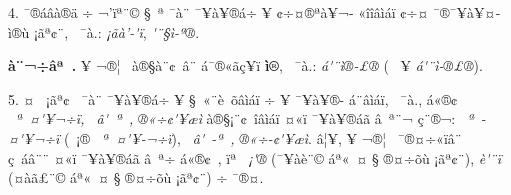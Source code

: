 \documentclass[12pt,twoside,a4paper]{article}
\newenvironment{prym}
               {\list{}{\leftmargin1.7\parindent
                        \listparindent\parindent
                        \itemindent\parindent
                        \parsep0.5ex\topsep1ex   
               }%
                        \footnotesize
                        \item\relax}
               {\endlist}
\begin{document}
4. ^^80^^af^^ae^^e1^^e2^^e0^^ae^^e4 ^^f7 ^^ac'^^ef^^aa^^a8^^a9 ^^a7^^ad^^a0^^aa ^^af^^e0^^a8 ^^af^^a5^^e0^^a5^^ad^^ae^^e1^^f7 ^^ad^^a5 ^^a2^^f7^^a4^^ae^^aa^^e0^^a5^^ac-\linebreak
^^ab^^ee^^ee^^e2^^ec^^e1^^ef ^^a2^^f7^^a4 ^^af^^ae^^af^^a5^^e0^^a5^^a4^^ad^^ec^^ae^^f9 ^^a1^^e3^^aa^^a2^^a8, ^^ad^^a0^^af^^e0.: \emph{^^a1^^e3^^e0'-\'^^ef^^ad}, \emph{^^ad\'^^a8^^a7^^ec-^^aa^^ae}.
\begin{prym}
\textbf{^^8f^^e0^^a8^^ac^^f7^^e2^^aa^^a0.} 
   ^^8d^^a5 ^^ac^^ae^^a6^^ad^^a0 ^^e0^^ae^^a7^^e0^^a8^^a2^^a0^^e2^^a8 ^^e1^^af^^ae^^ab^^e3^^e7^^a5^^ad^^ad^^ef \textbf{^^ec^^ae}, ^^ad^^a0^^af^^e0.: \linebreak
\emph{^^e1\'^^a8^^ad^^ec^^ae-^^a3^^ae} (^^a0 ^^ad^^a5 \emph{^^e1\'^^a8^^ad^^ec-^^ae^^a3^^ae}).
\end{prym}

5. ^^8e^^a4^^ad^^a0 ^^a1^^e3^^aa^^a2^^a0 ^^af^^e0^^a8 ^^af^^a5^^e0^^a5^^ad^^ae^^e1^^f7 ^^ad^^a5 ^^a7^^a0^^ab^^a8^^e8^^a0^^f5^^e2^^ec^^e1^^ef ^^f7 ^^ad^^a5 ^^af^^a5^^e0^^a5^^ad^^ae-\linebreak
^^e1^^a8^^e2^^ec^^e1^^ef, ^^ad^^a0^^af^^e0., ^^e1^^ab^^ae^^a2^^a0 \emph{^^a0^^aa^^a0^^a4\'^^a5^^ac^^f7^^ef, ^^a0^^e2\'^^a0^^aa^^a0, ^^ae^^ab^^f7^^a2\'^^a5^^e6^^ec} 
                                        ^^e0^^ae^^a7^^a1^^a8^^a2^^a0^^ee^^e2^^ec^^e1^^ef \linebreak
^^a4^^ab^^ef ^^af^^a5^^e0^^a5^^ad^^ae^^e1^^e3 ^^e2^^a0^^aa^^a8^^ac ^^e7^^a8^^ad^^ae^^ac: \emph{^^a0^^aa^^a0-^^a4\'^^a5^^ac^^f7^^ef} 
           (^^a0^^a1^^ae \emph{^^a0^^aa^^a0^^a4\'^^a5-^^ac^^f7^^ef}), \emph{^^a0^^e2\'^^a0-^^aa^^a0, \linebreak
^^ae^^ab^^f7-^^a2\'^^a5^^e6^^ec}. ^^8e^^e2^^a6^^a5, ^^ad^^a5 ^^ac^^ae^^a6^^ad^^a0 ^^af^^ae^^a4^^f7^^ab^^ef^^e2^^a8 ^^ad^^a0 ^^e7^^a0^^e1^^e2^^a8^^ad^^a8 
                                        ^^a4^^ab^^ef ^^af^^a5^^e0^^a5^^ad^^ae^^e1^^e3 \linebreak
^^e2^^a0^^aa^^f7 ^^e1^^ab^^ae^^a2^^a0, ^^ef^^aa \emph{^^a0^^a1\'^^ae} 
         (^^af^^a5^^e0^^e8^^a8^^a9 ^^e1^^aa^^ab^^a0^^a4 ^^a7 ^^ae^^a4^^ad^^f7^^f5^^f9 ^^a1^^e3^^aa^^a2^^a8), \emph{^^e8\'^^a8^^ef} \linebreak
(^^a4^^e0^^e3^^a3^^a8^^a9 ^^e1^^aa^^ab^^a0^^a4 ^^a7 ^^ae^^a4^^ad^^f7^^f5^^f9 ^^a1^^e3^^aa^^a2^^a8) ^^f7 ^^af^^ae^^a4.
\end{document}
